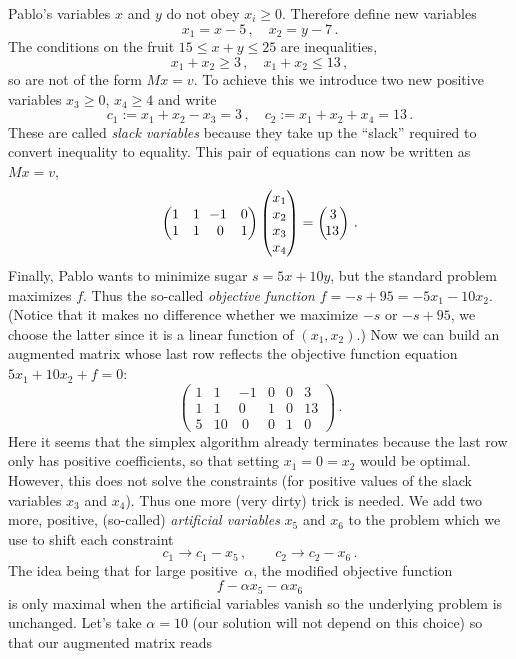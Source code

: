 \begin{example}
Pablo's variables $x$ and $y$ do not obey $x_i\geq 0$. Therefore define new variables 
\[
x_1=x-5\, , \quad x_2=y-7\, .
\]
The conditions on the fruit $15\leq x+y\leq 25$ are inequalities, 
\[
x_1+x_2\geq 3\, ,\quad x_1+x_2\leq 13\, ,
\] 
so are not of the form $Mx = v$. To achieve this we introduce two new positive variables $x_3\geq0$, $x_4\geq 4$ and write
\[
c_1:=x_1+x_2-x_3=3\, ,\quad c_2:=x_1 + x_2 + x_4=13\, .
\]
These are called {\itshape slack variables} because they take up the ``slack'' required to convert inequality to equality.
This pair of equations can now be written as $Mx=v$,
\[
\begin{pmatrix}
1 &1&\!\!-1&0\\
1&1&0&1
\end{pmatrix}
\begin{pmatrix} x_1\\x_2\\x_3\\x_4 \end{pmatrix}=
\begin{pmatrix} 3\\\!13 \end{pmatrix}\, .
\]
Finally, Pablo wants to minimize sugar $s=5x+10y$, but the standard problem maximizes $f$. Thus the so-called {\itshape objective function}
$f=-s+95=-5x_1-10x_2$. (Notice that it makes no difference whether we maximize $-s$ or $-s+95$, we choose the latter since it is
a linear function of $(x_1,x_2)$.)
Now we can build an augmented matrix whose last row reflects  the objective function equation $5 x_1+10 x_2 +f=0$:
\[
\left(\begin{array}{rrrrr|r}
1&1&-1&0&0&3\\
1&1&0&1&0&13\\\hline
5&10&\ 0&0&1&0
\end{array}\right)\, .
\]
Here it seems that the simplex algorithm already terminates because the last row only has positive coefficients, so that setting $x_1=0=x_2$
would be optimal. However, this does not solve the constraints (for positive values of the slack variables $x_3$ and $x_4$).
Thus one more (very dirty) trick is needed. We add two more, positive, (so-called) {\itshape artificial variables} $x_5$ and $x_6$ to the problem
which we use to shift each constraint 
\[
c_1\to c_1-x_5\, ,\qquad c_2\to c_2-x_6\, .
\]
The idea being that for large positive~$\alpha$,  the modified objective function \[f-\alpha x_5 - \alpha x_6\]
is only maximal when the artificial variables vanish so the underlying problem is unchanged. 
Let's take $\alpha=10$ (our solution will not depend on this choice) so that our augmented matrix reads 
\begin{align*}

\end{align*}
\end{example}
